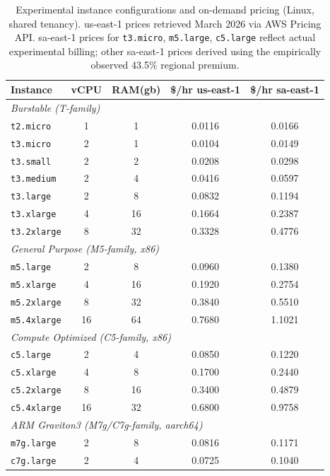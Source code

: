 \documentclass[conference]{IEEEtran}
\begin{document}
\begin{table}[!htbp]
	\centering
	\caption{Experimental instance configurations and on-demand pricing (Linux, shared tenancy). us-east-1 prices retrieved March 2026 via AWS Pricing API. sa-east-1 prices for \texttt{t3.micro}, \texttt{m5.large}, \texttt{c5.large} reflect actual experimental billing; other sa-east-1 prices derived using the empirically observed 43.5\% regional premium.}
	\label{tab:experimental_configurations}
	\begin{tabular}{|l|c|c|c|c|}
		\hline
		\textbf{Instance} & \textbf{vCPU} & \textbf{RAM(gb)} & \textbf{\$/hr us-east-1} & \textbf{\$/hr sa-east-1} \\
		\hline
		\multicolumn{5}{|l|}{\textit{Burstable (T-family)}} \\
		\hline
		\texttt{t2.micro}   & 1  & 1  & 0.0116 & 0.0166 \\
		\texttt{t3.micro}   & 2  & 1  & 0.0104 & 0.0149 \\
		\texttt{t3.small}   & 2  & 2  & 0.0208 & 0.0298 \\
		\texttt{t3.medium}  & 2  & 4  & 0.0416 & 0.0597 \\
		\texttt{t3.large}   & 2  & 8  & 0.0832 & 0.1194 \\
		\texttt{t3.xlarge}  & 4  & 16 & 0.1664 & 0.2387 \\
		\texttt{t3.2xlarge} & 8  & 32 & 0.3328 & 0.4776 \\
		\hline
		\multicolumn{5}{|l|}{\textit{General Purpose (M5-family, x86)}} \\
		\hline
		\texttt{m5.large}   & 2  & 8  & 0.0960 & 0.1380 \\
		\texttt{m5.xlarge}  & 4  & 16 & 0.1920 & 0.2754 \\
		\texttt{m5.2xlarge} & 8  & 32 & 0.3840 & 0.5510 \\
		\texttt{m5.4xlarge} & 16 & 64 & 0.7680 & 1.1021 \\
		\hline
		\multicolumn{5}{|l|}{\textit{Compute Optimized (C5-family, x86)}} \\
		\hline
		\texttt{c5.large}   & 2  & 4  & 0.0850 & 0.1220 \\
		\texttt{c5.xlarge}  & 4  & 8  & 0.1700 & 0.2440 \\
		\texttt{c5.2xlarge} & 8  & 16 & 0.3400 & 0.4879 \\
		\texttt{c5.4xlarge} & 16 & 32 & 0.6800 & 0.9758 \\
		\hline
		\multicolumn{5}{|l|}{\textit{ARM Graviton3 (M7g/C7g-family, aarch64)}} \\
		\hline
		\texttt{m7g.large}  & 2  & 8  & 0.0816 & 0.1171 \\
		\texttt{c7g.large}  & 2  & 4  & 0.0725 & 0.1040 \\
		\hline
	\end{tabular}
\end{table}
\end{document}
